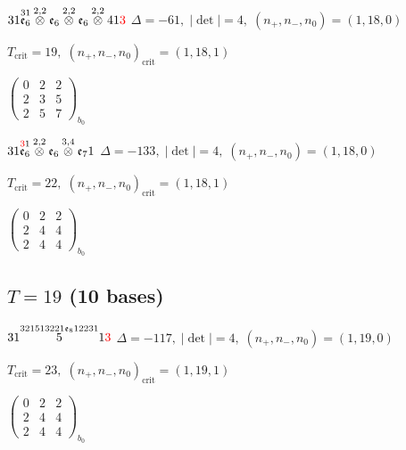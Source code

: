 \documentclass[10pt]{article}
\begin{document}
\smallskip

$31\overset{31}{\mathfrak{e}_6}\overset{2,2}{\otimes}\mathfrak{e}_6\overset{2,2}{\otimes}\mathfrak{e}_6\overset{2,2}{\otimes}41\textcolor{red}{3}$ \quad $\Delta=-61,\; |\det|=4,\; (n_+,n_-,n_0)=(1,18,0)$

\hspace{1em}$T_{\text{crit}}=19,\; (n_+,n_-,n_0)_{\text{crit}}=(1,18,1)$

\hspace{2em}$\left(\begin{smallmatrix}0 & 2 & 2 \\ 2 & 3 & 5 \\ 2 & 5 & 7\end{smallmatrix}\right)_{\!b_0}$

\smallskip

$31\overset{\textcolor{red}{3}1}{\mathfrak{e}_6}\overset{2,2}{\otimes}\mathfrak{e}_6\overset{3,4}{\otimes}\mathfrak{e}_71$ \quad $\Delta=-133,\; |\det|=4,\; (n_+,n_-,n_0)=(1,18,0)$

\hspace{1em}$T_{\text{crit}}=22,\; (n_+,n_-,n_0)_{\text{crit}}=(1,18,1)$

\hspace{2em}$\left(\begin{smallmatrix}0 & 2 & 2 \\ 2 & 4 & 4 \\ 2 & 4 & 4\end{smallmatrix}\right)_{\!b_0}$


\subsection*{$T = 19$ \quad (10 bases)}
\smallskip

$31\overset{321513221\mathfrak{e}_812231}{5}1\textcolor{red}{3}$ \quad $\Delta=-117,\; |\det|=4,\; (n_+,n_-,n_0)=(1,19,0)$

\hspace{1em}$T_{\text{crit}}=23,\; (n_+,n_-,n_0)_{\text{crit}}=(1,19,1)$

\hspace{2em}$\left(\begin{smallmatrix}0 & 2 & 2 \\ 2 & 4 & 4 \\ 2 & 4 & 4\end{smallmatrix}\right)_{\!b_0}$
\end{document}
